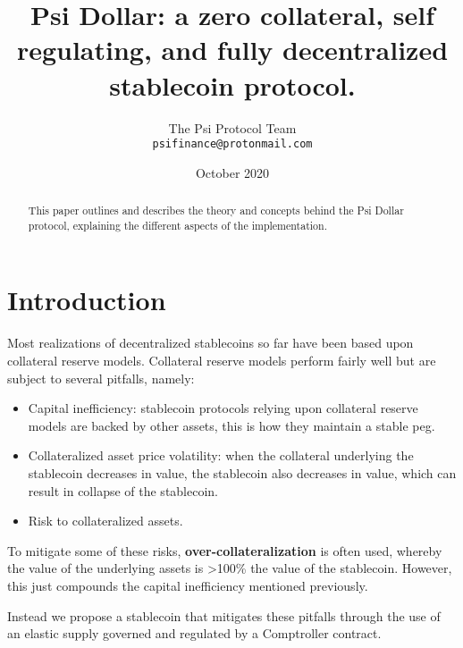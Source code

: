 \documentclass[a4paper, 12pt]{article}
\begin{document}
	\title{\Large{\textbf{Psi Dollar: a zero collateral, self regulating, and fully decentralized stablecoin protocol.}}}
	\author{The Psi Protocol Team \\ \texttt{psifinance@protonmail.com}}
	\date{October 2020}

	\maketitle

	\begin{abstract}
		This paper outlines and describes the theory and concepts behind the Psi Dollar protocol, explaining the different aspects of the implementation. 
	\end{abstract}

	\newpage
	
	\tableofcontents

	\newpage

	\section{Introduction}
	Most realizations of decentralized stablecoins so far have been based upon collateral reserve models. Collateral reserve models perform fairly well but are subject to several pitfalls, namely:
	
	\begin{itemize}
		
		\item{Capital inefficiency: stablecoin protocols relying upon collateral reserve models are backed by other assets, this is how they maintain a stable peg.}
		\item{Collateralized asset price volatility: when the collateral underlying the stablecoin decreases in value, the stablecoin also decreases in value, which can result in collapse of the stablecoin.}
		\item{Risk to collateralized assets.}
		
	\end{itemize}

	To mitigate some of these risks, \textbf{over-collateralization} is often used, whereby the value of the underlying assets is \textgreater100\% the value of the stablecoin. However, this just compounds 	the capital inefficiency mentioned previously. \newline
	

	Instead we propose a stablecoin that mitigates these pitfalls through the use of an elastic supply governed and regulated by a Comptroller contract.
\end{document}
